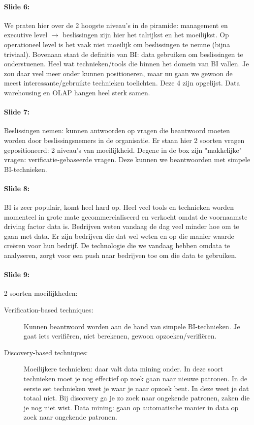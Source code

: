 \documentclass[10pt,a4paper]{report}
\begin{document}
\paragraph{Slide 6:}We praten hier over de 2 hoogste niveau's in de piramide: management en executive level $\rightarrow$ beslissingen zijn hier het talrijkst en het moeilijkst. Op operationeel level is het vaak niet moeilijk om beslissingen te nemne (bijna triviaal).
Bovenaan staat de definitie van BI: data gebruiken om beslissingen te onderstuenen.
Heel wat technieken/tools die binnen het domein van BI vallen. Je zou daar veel meer onder kunnen positioneren, maar nu gaan we gewoon de meest interessante/gebruikte technieken toelichten. Deze 4 zijn opgelijst. Data warehousing en OLAP hangen heel sterk samen.

\paragraph{Slide 7:}Beslissingen nemen: kunnen antwoorden op vragen die beantwoord moeten worden door beslissingsnemers in de organisatie. Er staan hier 2 soorten vragen gepositioneerd: 2 niveau's van moeilijkheid. Degene in de box zijn "makkelijke" vragen: verificatie-gebaseerde vragen. Deze kunnen we beantwoorden met simpele BI-technieken.

\paragraph{Slide 8:}BI is zeer populair, komt heel hard op. Heel veel tools en technieken worden momenteel in grote mate gecommercialiseerd en verkocht omdat de voornaamste driving factor data is. Bedrijven weten vandaag de dag veel minder hoe om te gaan met data. Er zijn bedrijven die dat wel weten en op die manier waarde creëren voor hun bedrijf. De technologie die we vandaag hebben omdata te analyseren, zorgt voor een push naar bedrijven toe om die data te gebruiken.

\paragraph{Slide 9:}2 soorten moeilijkheden:
\begin{description}
\item[Verification-based techniques:]Kunnen beantwoord worden aan de hand van simpele BI-technieken. Je gaat iets verifiëren, niet berekenen, gewoon opzoeken/verifiëren.
\item[Discovery-based techniques:]Moeilijkere technieken: daar valt data mining onder. In deze soort technieken moet je nog effectief op zoek gaan naar nieuwe patronen. In de eerste set technieken weet je waar je naar opzoek bent. In deze weet je dat totaal niet. Bij discovery ga je zo zoek naar ongekende patronen, zaken die je nog niet wist. Data mining: gaan op automatische manier in data op zoek naar ongekende patronen.
\end{description}
\end{document}
